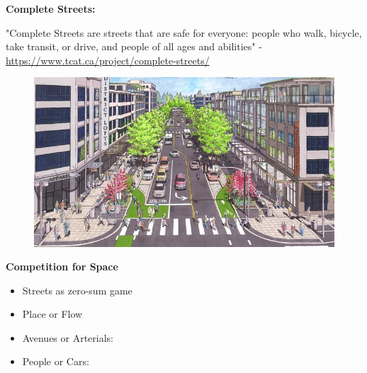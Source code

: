 \documentclass[aspectratio=169]{beamer}
\begin{document}
\begin{frame}
	
	\textbf{Complete Streets:} 
	
	\vspace{4mm}
	
	{"Complete Streets are streets that are safe for everyone: people who walk, bicycle, take transit, or drive, and people of all ages and abilities"}
	\tiny - \url{https://www.tcat.ca/project/complete-streets/}
	
	\begin{figure}
		\centering
		\includegraphics[width=0.65\linewidth]{images/complete_street_drawing.jpg}
	\end{figure}
	
	
	
\end{frame}





\begin{frame}
	
	\textbf{Competition for Space}
	
	\begin{itemize}
		\item Streets as zero-sum game
		
		\item Place or Flow
		
		\item Avenues or Arterials:
		
		\item People or Cars:
		
	\end{itemize}
	
	
	
\end{frame}
\end{document}
